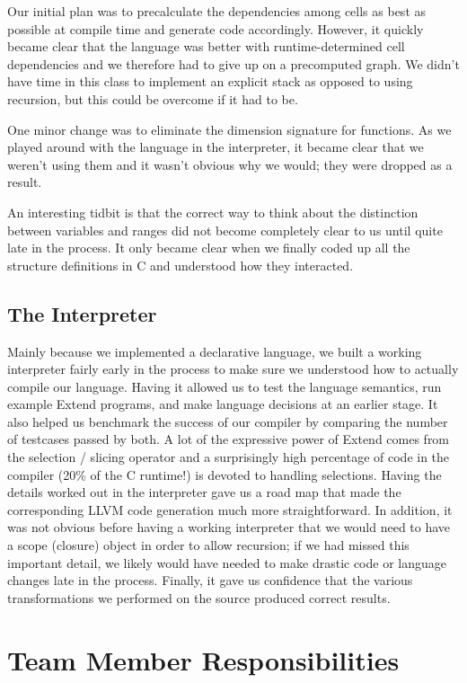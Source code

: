 Our initial plan was to precalculate the dependencies among cells as best as possible at compile time and generate code accordingly. However, it quickly became clear that the language was better with runtime-determined cell dependencies and we therefore had to give up on a precomputed graph. We didn't have time in this class to implement an explicit stack as opposed to using recursion, but this could be overcome if it had to be.

One minor change was to eliminate the dimension signature for functions. As we played around with the language in the interpreter, it became clear that we weren't using them and it wasn't obvious why we would; they were dropped as a result.

An interesting tidbit is that the correct way to think about the distinction between variables and ranges did not become completely clear to us until quite late in the process. It only became clear when we finally coded up all the structure definitions in C and understood how they interacted. 

  \subsection{The Interpreter}
  Mainly because we implemented a declarative language, we built a working interpreter fairly early in the process to make sure we understood how to actually compile our language. Having it allowed us to test the language semantics, run example Extend programs, and make language decisions at an earlier stage. It also helped us benchmark the success of our compiler by comparing the number of testcases passed by both. A lot of the expressive power of Extend comes from the selection / slicing operator and a surprisingly high percentage of code in the compiler (20\% of the C runtime!) is devoted to handling selections. Having the details worked out in the interpreter gave us a road map that made the corresponding LLVM code generation much more straightforward. In addition, it was not obvious before having a working interpreter that we would need to have a scope (closure) object in order to allow recursion; if we had missed this important detail, we likely would have needed to make drastic code or language changes late in the process. Finally, it gave us confidence that the various transformations we performed on the source produced correct results.

\section{Team Member Responsibilities}

